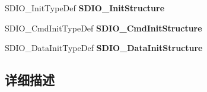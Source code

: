\begin{DoxyCompactItemize}
\item 
S\+D\+I\+O\+\_\+\+Init\+Type\+Def {\bfseries S\+D\+I\+O\+\_\+\+Init\+Structure}\hypertarget{group___s_t_m324x_g___e_v_a_l___s_d_i_o___s_d___private___variables_gad17d379a81412a4e045414fc358ec459}{}\label{group___s_t_m324x_g___e_v_a_l___s_d_i_o___s_d___private___variables_gad17d379a81412a4e045414fc358ec459}

\item 
S\+D\+I\+O\+\_\+\+Cmd\+Init\+Type\+Def {\bfseries S\+D\+I\+O\+\_\+\+Cmd\+Init\+Structure}\hypertarget{group___s_t_m324x_g___e_v_a_l___s_d_i_o___s_d___private___variables_gab48ffe3f6c5fdd6b06605dd4d99d5523}{}\label{group___s_t_m324x_g___e_v_a_l___s_d_i_o___s_d___private___variables_gab48ffe3f6c5fdd6b06605dd4d99d5523}

\item 
S\+D\+I\+O\+\_\+\+Data\+Init\+Type\+Def {\bfseries S\+D\+I\+O\+\_\+\+Data\+Init\+Structure}\hypertarget{group___s_t_m324x_g___e_v_a_l___s_d_i_o___s_d___private___variables_ga113c3ce26c1cd49c8b13fc1c9650f675}{}\label{group___s_t_m324x_g___e_v_a_l___s_d_i_o___s_d___private___variables_ga113c3ce26c1cd49c8b13fc1c9650f675}

\end{DoxyCompactItemize}


\subsection{详细描述}
